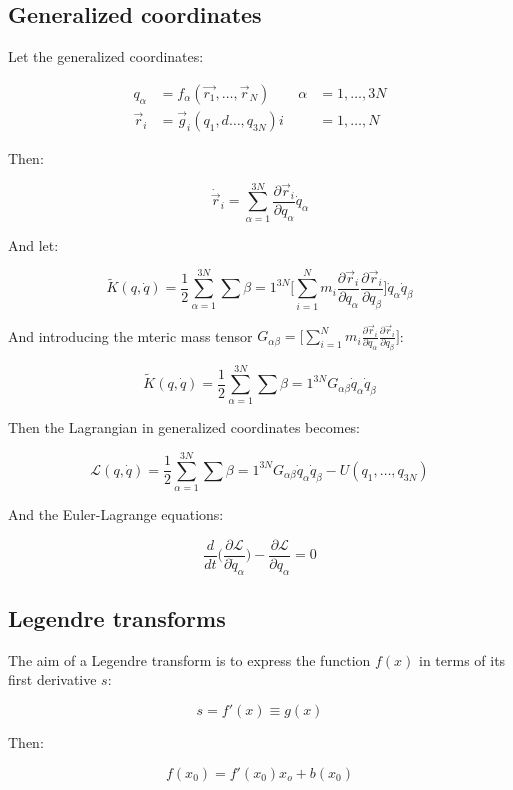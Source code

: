 	\subsection{Generalized coordinates}
	Let the generalized coordinates:

	\begin{align*}
			q_\alpha &= f_\alpha(\vec{r_1}, \dots, \vec{r}_N)\qquad \alpha &= 1, \dots, 3N\\
			\vec{r}_i &=\vec{g}_i(q_1, d\dots, q_{3N}) i &=1, \dots, N
	\end{align*}

	Then:

	$$\dot{\vec{r}}_i = \sum\limits_{\alpha=1}^{3N}\frac{\partial \vec{r}_i}{\partial q_\alpha}\dot{q}_\alpha$$

	And let:

	$$\tilde{K}(q, \dot{q}) = \frac{1}{2}\sum\limits_{\alpha=1}^{3N}\sum\limits{\beta=1}^{3N}\biggl[\sum\limits_{i=1}^Nm_i\frac{\partial\vec{r}_i}{\partial q_\alpha}\frac{\partial\vec{r}_i}{\partial q_\beta}\biggr]\dot{q}_\alpha\dot{q}_\beta$$

	And introducing the mteric mass tensor $G_{\alpha\beta} = \biggl[\sum\limits_{i=1}^Nm_i\frac{\partial\vec{r}_i}{\partial q_\alpha}\frac{\partial\vec{r}_i}{\partial q_\beta}\biggr]$:

	$$\tilde{K}(q, \dot{q}) = \frac{1}{2}\sum\limits_{\alpha=1}^{3N}\sum\limits{\beta=1}^{3N}G_{\alpha\beta}\dot{q}_\alpha\dot{q}_\beta$$

	Then the Lagrangian in generalized coordinates becomes:

	$$\mathcal{L}(q, \dot{q}) =\frac{1}{2}\sum\limits_{\alpha=1}^{3N}\sum\limits{\beta=1}^{3N}G_{\alpha\beta}\dot{q}_\alpha\dot{q}_\beta - U(q_1, \dots, q_{3N})$$

	And the Euler-Lagrange equations:

	$$\frac{d}{dt}\biggl(\frac{\partial\mathcal{L}}{\partial\dot{q}_\alpha}\biggr) -\frac{\partial\mathcal{L}}{\partial q_\alpha} = 0$$

	\subsection{Legendre transforms}
	The aim of a Legendre transform is to express the function $f(x)$ in terms of its first derivative $s$:

	$$s = f'(x) \equiv g(x)$$

	Then:

	$$f(x_0) = f'(x_0)x_o + b(x_0)$$

